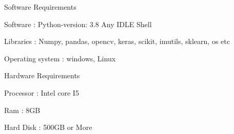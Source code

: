 Software Requirements

	Software	 :	Python-version: 3.8 Any IDLE Shell

	Libraries	 : 	Numpy, pandas, opencv, keras, scikit, imutils, sklearn, os etc

	Operating system : 	windows, Linux


Hardware Requirements
 
	Processor	 :	 Intel core I5

	Ram		 :	 8GB

	Hard Disk	 :	 500GB or More


